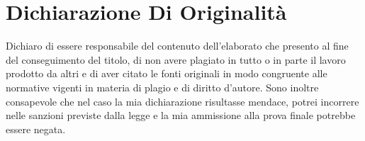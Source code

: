 \chapter*{Dichiarazione Di Originalità}

Dichiaro di essere responsabile del contenuto dell'elaborato che
presento al fine del conseguimento del titolo, di non avere plagiato in
tutto o in parte il lavoro prodotto da altri e di aver citato le fonti
originali in modo congruente alle normative vigenti in materia di plagio
e di diritto d'autore. Sono inoltre consapevole che nel caso la mia
dichiarazione risultasse mendace, potrei incorrere nelle sanzioni
previste dalla legge e la mia ammissione alla prova finale potrebbe
essere negata.
